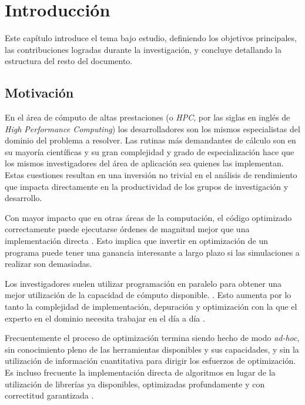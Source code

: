 \documentclass[a4paper]{report}
\begin{document}
\tableofcontents

\listoffigures
\listoftables
\lstlistoflistings

\chapter{Introducción}

Este capítulo introduce el tema bajo estudio, definiendo los objetivos principales, las contribuciones logradas durante la investigación, y concluye detallando la estructura del resto del documento.

\section{Motivación}

En el área de cómputo de altas prestaciones (o {\it HPC}, por las siglas en inglés de {\it High Performance Computing}) los desarrolladores son los mismos especialistas del dominio del
 problema a resolver. Las rutinas más demandantes de cálculo son en su mayoría científicas y su gran complejidad y grado de especialización hace que los mismos investigadores del área de aplicación sea quienes las implementan.
Estas cuestiones resultan en una inversión no trivial en el análisis de rendimiento que impacta directamente en la productividad de los grupos de investigación y desarrollo.

\bigskip

Con mayor impacto que en otras áreas de la computación, el código optimizado correctamente puede ejecutarse órdenes de magnitud mejor que una implementación directa \cite{gpu-myth}. Esto implica que invertir en optimización de un programa puede tener una ganancia interesante a largo plazo si las simulaciones a realizar son demasiadas.

\bigskip

Los investigadores suelen utilizar programación en paralelo para obtener una mejor utilización de la capacidad de cómputo disponible.
\cite{emergingmulticore}. Esto aumenta por lo tanto la complejidad de implementación, depuración y
optimización con la que el experto en el dominio necesita trabajar en el día a día \cite{is-parallel-programming-hard} \cite{massiveparallel}.

\bigskip

Frecuentemente el proceso de optimización termina siendo hecho de modo {\it ad-hoc}, sin conocimiento pleno de las herramientas disponibles y sus capacidades, y sin la utilización de
información cuantitativa para dirigir los esfuerzos de optimización. Es incluso frecuente la implementación directa de algoritmos en lugar de la utilización de librerías ya disponibles,
optimizadas profundamente y con correctitud garantizada \cite{mklbook}.
\end{document}
